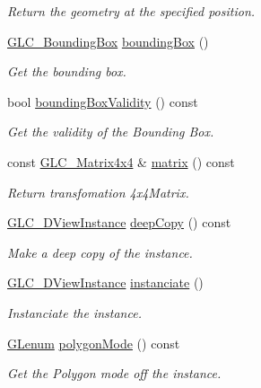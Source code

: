 \begin{DoxyCompactItemize}
\begin{DoxyCompactList}\small\item\em Return the geometry at the specified position. \end{DoxyCompactList}\item 
\hyperlink{class_g_l_c___bounding_box}{G\-L\-C\-\_\-\-Bounding\-Box} \hyperlink{class_g_l_c__3_d_view_instance_a83333f197d398990cf50e269be1250ba}{bounding\-Box} ()
\begin{DoxyCompactList}\small\item\em Get the bounding box. \end{DoxyCompactList}\item 
bool \hyperlink{class_g_l_c__3_d_view_instance_ab990a3979aa3e49847e4367893b14978}{bounding\-Box\-Validity} () const 
\begin{DoxyCompactList}\small\item\em Get the validity of the Bounding Box. \end{DoxyCompactList}\item 
const \hyperlink{class_g_l_c___matrix4x4}{G\-L\-C\-\_\-\-Matrix4x4} \& \hyperlink{class_g_l_c__3_d_view_instance_ab9942aa0e228892a20744aaadb736784}{matrix} () const 
\begin{DoxyCompactList}\small\item\em Return transfomation 4x4\-Matrix. \end{DoxyCompactList}\item 
\hyperlink{class_g_l_c__3_d_view_instance}{G\-L\-C\-\_\-D\-View\-Instance} \hyperlink{class_g_l_c__3_d_view_instance_a164d9ab7849791e33fc808ec9cb4ea00}{deep\-Copy} () const 
\begin{DoxyCompactList}\small\item\em Make a deep copy of the instance. \end{DoxyCompactList}\item 
\hyperlink{class_g_l_c__3_d_view_instance}{G\-L\-C\-\_\-D\-View\-Instance} \hyperlink{class_g_l_c__3_d_view_instance_a51b9bf1a5608a467730bd2d3670db7c2}{instanciate} ()
\begin{DoxyCompactList}\small\item\em Instanciate the instance. \end{DoxyCompactList}\item 
\hyperlink{glext_8h_a508b2dec21679e2e346cad3e0d1969bf}{G\-Lenum} \hyperlink{class_g_l_c__3_d_view_instance_a79f269407d2877900a6efcfd33facf20}{polygon\-Mode} () const 
\begin{DoxyCompactList}\small\item\em Get the Polygon mode off the instance. \end{DoxyCompactList}\item 

\end{DoxyCompactItemize}
